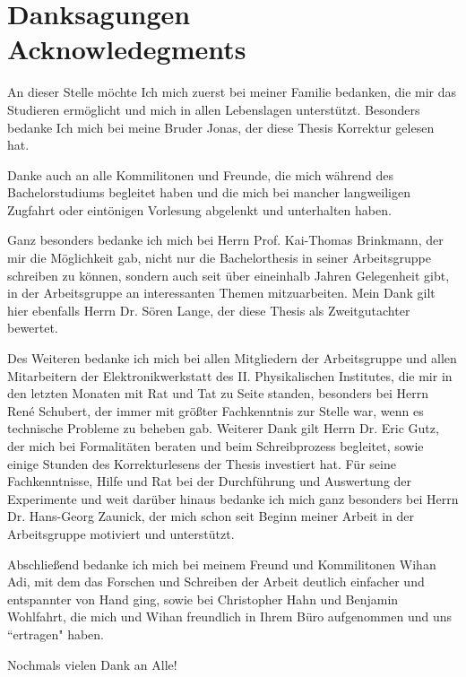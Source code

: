 \chapter*{Danksagungen\\ \LARGE \normalfont Acknowledegments}
%

An dieser Stelle m{\"o}chte Ich mich zuerst bei meiner Familie bedanken, die mir das Studieren erm{\"o}glicht und mich in allen Lebenslagen unterst{\"u}tzt. Besonders bedanke Ich mich bei meine Bruder Jonas, der diese Thesis Korrektur gelesen hat. \par 
Danke auch an alle Kommilitonen und Freunde, die mich w{\"a}hrend des Bachelorstudiums begleitet haben und die mich bei mancher langweiligen Zugfahrt oder eint{\"o}nigen Vorlesung abgelenkt und unterhalten haben. \par 
Ganz besonders bedanke ich mich bei Herrn Prof. Kai-Thomas Brinkmann, der mir die M{\"o}glichkeit gab, nicht nur die Bachelorthesis in seiner Arbeitsgruppe schreiben zu k{\"o}nnen, sondern auch seit {\"u}ber eineinhalb Jahren Gelegenheit gibt, in der Arbeitsgruppe an interessanten Themen mitzuarbeiten. Mein Dank gilt hier ebenfalls Herrn Dr. S{\"o}ren Lange, der diese Thesis als Zweitgutachter bewertet. \par
Des Weiteren bedanke ich mich bei allen Mitgliedern der Arbeitsgruppe und allen Mitarbeitern der Elektronikwerkstatt des II. Physikalischen Institutes, die mir in den letzten Monaten mit Rat und Tat zu Seite standen, besonders bei Herrn Ren\'{e} Schubert, der immer mit gr{\"o}\ss ter Fachkenntnis zur Stelle war, wenn es technische Probleme zu beheben gab. Weiterer Dank gilt Herrn Dr. Eric Gutz, der mich bei Formalit{\"a}ten beraten und beim Schreibprozess begleitet, sowie einige Stunden des Korrekturlesens der Thesis investiert hat. F{\"u}r seine Fachkenntnisse, Hilfe und Rat bei der Durchf{\"u}hrung und Auswertung der Experimente und weit dar{\"u}ber hinaus bedanke ich mich ganz besonders bei Herrn Dr. Hans-Georg Zaunick, der mich schon seit Beginn meiner Arbeit in der Arbeitsgruppe motiviert und unterst{\"u}tzt. \par 
Abschlie\ss end bedanke ich mich bei meinem Freund und Kommilitonen Wihan Adi, mit dem das Forschen und Schreiben der Arbeit deutlich einfacher und entspannter von Hand ging, sowie bei Christopher Hahn und Benjamin Wohlfahrt, die mich und Wihan freundlich in Ihrem B{\"u}ro aufgenommen und uns ``ertragen" haben. \par 
Nochmals vielen Dank an Alle!




